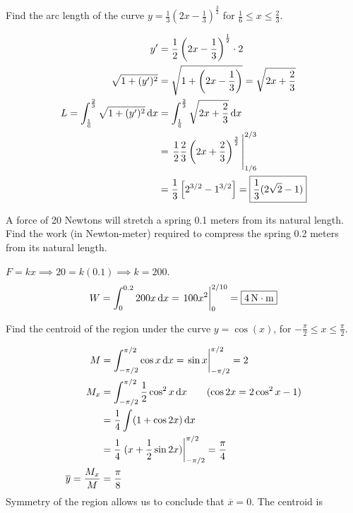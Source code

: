 \documentclass[12pt,answers]{exam}
\begin{document}
\begin{questions}

\question[8]
Find the arc length of the curve $\displaystyle y = \frac13 \left(2x-\frac13\right)^{\frac32}$ for $\displaystyle \frac16 \le x \le \frac23$.
\begin{solution}
    \begin{align*}
        y' &= \frac12 \left(2x-\frac13\right)^{\frac12} \cdot 2 \\ 
        \sqrt{1+(y')^2} &= \sqrt{1+\left(2x-\frac13\right)} = \sqrt{2x+\frac23} \\
        L = \int_{\frac16}^{\frac23} \sqrt{1+(y')^2} \dif x 
        &= \int_{\frac16}^{\frac23} \sqrt{2x+\frac23} \dif x \\ 
        &= \eval{\frac12 \frac23 \left(2x+\frac23\right)^{\frac32}}_{1/6}^{2/3} \\ 
        &= \frac13 \left[ 2^{3/2} - 1^{3/2}\right] 
        = \boxed{\frac13 (2\sqrt 2 - 1)}
    \end{align*}

\end{solution}

\question[6]
A force of 20 Newtons will stretch a spring 0.1 meters from its natural length.
Find the work (in Newton-meter) required to compress the spring 0.2 meters from its natural length.
\begin{solution}
    $F = k x \implies 20 = k(0.1) \implies k = 200$. 
    \[
        W = \int_{0}^{0.2} 200 x \dif x = \eval{100x^2}_0^{2/10} = \boxed{4 \, \text{N}\cdot \text{m}}
    \]
\end{solution}

\newpage
\question[10]
Find the centroid of the region under the curve $y=\cos(x)$, for $\displaystyle -\frac{\pi}{2} \le x \le \frac\pi2$.
\begin{solution}
    \begin{align*}
        M &= \int_{-\pi/2}^{\pi/2} \cos x\dif x
        = \eval{\sin x}_{-\pi/2}^{\pi/2} = 2
        \\
        M_x &= \int_{-\pi/2}^{\pi/2} \frac12 \cos^2 x\dif x 
        \qquad (\cos2x = 2\cos^2 x - 1)
        \\ 
        &= \frac14 \int (1 + \cos 2x) \dif x \\ 
        &= \frac14 \eval{(x + \frac12 \sin 2x)}_{-\pi/2}^{\pi/2}
        = \frac\pi4
        \\
        \overline y = \frac{M_x}{M} &= \frac\pi8
    \end{align*}
    Symmetry of the region allows us to conclude that $\overline x = 0$.
    The centroid is 
\end{solution}


\end{questions}
\end{document}
